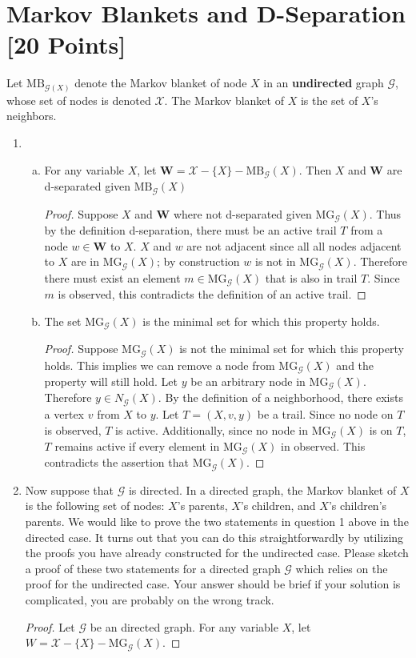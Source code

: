 \documentclass[12pt]{article}
\newcommand{\mg} {
\text{MG}_{\mathcal{G}}
}
\begin{document}
\section{Markov Blankets and D-Separation [20 Points]}
Let $\text{MB}_{\mathcal{G}(X)}$ denote the Markov blanket of node $X$ in an \textbf{undirected} graph $\mathcal{G}$, whose set of nodes is denoted $\mathcal{X}$. The Markov blanket of $X$ is the set of $X$'s neighbors. 
\begin{enumerate}[1.]	
	\item 
	\begin{enumerate}[(a)]
		\item For any variable $X$, let $\mathbf{W} = \mathcal{X} - \{X\} - \text{MB}_{\mathcal{G}}(X)$. Then $X$ and $\mathbf{W}$ are d-separated given $\text{MB}_{\mathcal{G}}(X)$
		\begin{proof}
		Suppose $X$ and $\mathbf{W}$ where not d-separated given $\text{MG}_{\mathcal{G}}(X)$. Thus by the definition d-separation, there must be an active trail $T$  from a node $w\in \mathbf{W}$ to $X$. $X$ and $w$ are not adjacent since all all nodes adjacent to $X$ are in $\text{MG}_{\mathcal{G}}(X)$; by construction $w$ is not in $\text{MG}_{\mathcal{G}}(X)$. Therefore there must exist an element $m \in \text{MG}_{\mathcal{G}}(X)$ that is also in trail $T$. Since $m$ is observed, this contradicts the definition of an active trail.
		\end{proof}
	\item The set $\text{MG}_{\mathcal{G}}(X)$ is the minimal set for which this property holds. 
		\begin{proof}
		Suppose $\mg(X)$ is not the minimal set for which this property holds. This implies we can remove a node from $\mg(X)$ and the property will still hold. Let $y$ be an arbitrary node in $\mg(X)$. Therefore $y \in N_\mathcal{G}(X)$. By the definition of a neighborhood, there exists a vertex $v$ from $X$ to $y$.  Let $T = (X, v, y)$ be a trail. Since no node on $T$ is observed, $T$ is active. Additionally, since no node in $\mg(X)$ is on $T$, $T$ remains active if every element in $\mg(X)$ in observed. This contradicts the assertion that $\mg(X)$. 
		\end{proof}
	\end{enumerate}
	\item 
			Now suppose that $\mathcal{G}$ is directed. In a directed graph, the Markov blanket of $X$ is the following set of nodes: $X$'s parents, $X$'s children, and $X$'s children’s parents. We would like to prove the two statements in question 1 above in the directed case. It turns out that you can do this straightforwardly by utilizing the proofs you have already constructed for the undirected case. Please sketch a proof of these two statements for a directed graph $\mathcal{G}$ which relies on the proof for the undirected case. Your answer should be brief if your solution is complicated, you are probably on the wrong track.
\begin{proof}
Let $\mathcal{G}$ be an directed graph. For any variable $X$, let $W = \mathcal{X} - \{ X\} - \mg(X)$. 


\end{proof}
\end{enumerate}
\end{document}
